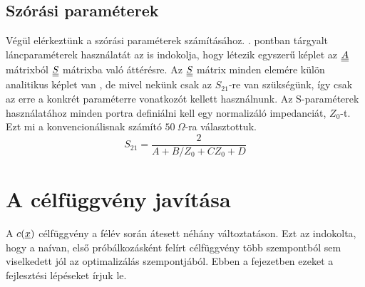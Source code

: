	\subsection{Szórási paraméterek}
        Végül elérkeztünk a szórási paraméterek számításához. . pontban tárgyalt láncparaméterek használatát az is indokolja, hogy létezik egyszerű képlet az $\underline{\underline{A}}$ mátrixból $\underline{\underline{S}}$ mátrixba való áttérésre. Az $\underline{\underline{S}}$ mátrix minden elemére külön analitikus képlet van \cite{lancpar_spar}, de mivel nekünk csak az $S_{21}$-re van szükségünk, így csak az erre a konkrét paraméterre vonatkozót kellett használnunk. Az S-paraméterek használatához minden portra definiálni kell egy normalizáló impedanciát, $Z_0$-t. Ezt mi a konvencionálisnak számító $\SI{50}{\Omega}$-ra választottuk. 
    \begin{equation}
        S_{21} = \dfrac{2}{A+B/Z_0+CZ_0+D}
    \end{equation}
\section{A célfüggvény javítása}
    \label{sec:celfuggveny_javitas}
    A $c(\underline{x})$ célfüggvény a félév során átesett néhány változtatáson. Ezt az indokolta, hogy a naívan, első próbálkozásként felírt célfüggvény több szempontból sem viselkedett jól az optimalizálás szempontjából. Ebben a fejezetben ezeket a fejlesztési lépéseket írjuk le.
